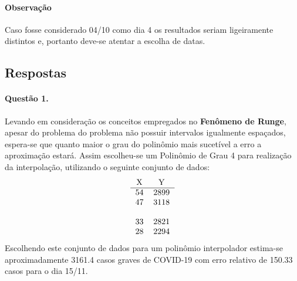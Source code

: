 \documentclass{article}
\begin{document}
        \paragraph{Observação}Caso fosse considerado 04/10 como dia 4 os resultados seriam ligeiramente distintos e, portanto deve-se atentar a escolha de datas.

    \subsection{Respostas}
        \paragraph{Questão 1.}Levando em consideração os conceitos empregados no \textbf{Fenômeno de Runge}, apesar do problema do problema não possuir intervalos igualmente espaçados, espera-se que quanto maior o grau do polinômio mais sucetível a erro a aproximação estará. Assim escolheu-se um Polinômio de Grau 4 para realização da interpolação, utilizando o seguinte conjunto de dados:
            \[
                \begin{tabular}{c c}
                    X  & Y\\ \hline
                    54 & 2899\\
                    47 & 3118\\
                       & \\
                    33 & 2821\\
                    28 & 2294\\
                \end{tabular}
            \]
        Escolhendo este conjunto de dados para um polinômio interpolador estima-se aproximadamente 3161.4 casos graves de COVID-19 com erro relativo de 150.33 casos para o dia 15/11.
\newpage
\end{document}
